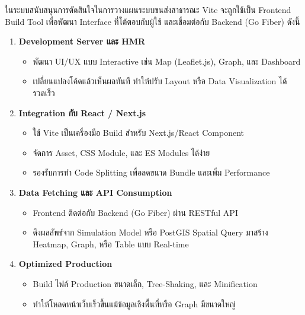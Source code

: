 ในระบบสนับสนุนการตัดสินใจในการวางแผนระบบขนส่งสาธารณะ Vite จะถูกใช้เป็น Frontend Build Tool เพื่อพัฒนา Interface ที่โต้ตอบกับผู้ใช้ และเชื่อมต่อกับ Backend (Go Fiber) ดังนี้

\begin{enumerate}
    \item \textbf{Development Server และ HMR}
    \begin{itemize}
        \item พัฒนา UI/UX แบบ Interactive เช่น Map (Leaflet.js), Graph, และ Dashboard
        \item เปลี่ยนแปลงโค้ดแล้วเห็นผลทันที ทำให้ปรับ Layout หรือ Data Visualization ได้รวดเร็ว
    \end{itemize}
    
    \item \textbf{Integration กับ React / Next.js}
    \begin{itemize}
        \item ใช้ Vite เป็นเครื่องมือ Build สำหรับ Next.js/React Component
        \item จัดการ Asset, CSS Module, และ ES Modules ได้ง่าย  
        \item รองรับการทำ Code Splitting เพื่อลดขนาด Bundle และเพิ่ม Performance
    \end{itemize}
    
    \item \textbf{Data Fetching และ API Consumption}
    \begin{itemize}
        \item Frontend ติดต่อกับ Backend (Go Fiber) ผ่าน RESTful API  
        \item ดึงผลลัพธ์จาก Simulation Model หรือ PostGIS Spatial Query มาสร้าง Heatmap, Graph, หรือ Table แบบ Real-time
    \end{itemize}
    
    \item \textbf{Optimized Production}
    \begin{itemize}
        \item Build ไฟล์ Production ขนาดเล็ก, Tree-Shaking, และ Minification  
        \item ทำให้โหลดหน้าเว็บเร็วขึ้นแม้ข้อมูลเชิงพื้นที่หรือ Graph มีขนาดใหญ่
    \end{itemize}
\end{enumerate}

